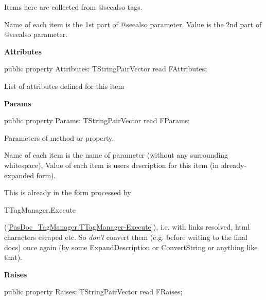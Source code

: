 \documentclass{report}
\newif\ifpdf
\begin{document}
\begin{list}{}
\par Items here are collected from @seealso tags.

Name of each item is the 1st part of @seealso parameter. Value is the 2nd part of @seealso parameter.\label{PasDoc_Items.TPasItem-Attributes}
\item[\textbf{Attributes}\hfill]
\ifpdf
\begin{flushleft}
\fi
\begin{ttfamily}
public property Attributes: TStringPairVector read FAttributes;\end{ttfamily}

\ifpdf
\end{flushleft}
\fi


\par List of attributes defined for this item\label{PasDoc_Items.TPasItem-Params}
\item[\textbf{Params}\hfill]
\ifpdf
\begin{flushleft}
\fi
\begin{ttfamily}
public property Params: TStringPairVector read FParams;\end{ttfamily}

\ifpdf
\end{flushleft}
\fi


\par Parameters of method or property.

Name of each item is the name of parameter (without any surrounding whitespace), Value of each item is users description for this item (in already{-}expanded form).

This is already in the form processed by \begin{ttfamily}TTagManager.Execute\end{ttfamily}(\ref{PasDoc_TagManager.TTagManager-Execute}), i.e. with links resolved, html characters escaped etc. So \textit{don't} convert them (e.g. before writing to the final docs) once again (by some ExpandDescription or ConvertString or anything like that).\label{PasDoc_Items.TPasItem-Raises}
\item[\textbf{Raises}\hfill]
\ifpdf
\begin{flushleft}
\fi
\begin{ttfamily}
public property Raises: TStringPairVector read FRaises;\end{ttfamily}

\ifpdf
\end{flushleft}
\fi



\end{list}
\end{document}
